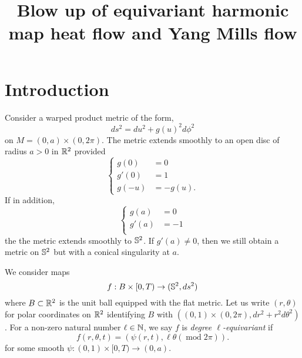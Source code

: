\documentclass{amsart}
\begin{document}
\title[]
 {Blow up of equivariant harmonic map heat flow and Yang Mills flow}

\curraddr{}
\email{}

\dedicatory{}
\subjclass[2010]{}
\keywords{}

\begin{abstract}
\end{abstract}

\maketitle

\section{Introduction}
\label{sec:intro}

Consider a warped product metric of the form,
\[
ds^2 = du^2 + g(u)^2 d\phi^2
\]
on $M = (0, a) \times (0, 2\pi)$. The metric extends smoothly to an open disc of radius $a > 0$ in $\R^2$ provided
\[
\begin{cases}
g(0) &= 0 \\
g'(0) &= 1 \\
g(-u) &= - g(u).
\end{cases}
\]
If in addition,
\[
\begin{cases}
g(a) &= 0 \\
g'(a) &= -1 \\
\end{cases}
\]
the the metric extends smoothly to $\S^2$. If $g'(a) \ne 0$, then we still obtain a metric on $\S^2$ but with a conical singularity at $a$.

We consider maps
\[
f : B \times [0, T) \to (\S^2, ds^2)
\]
where $B \subset \R^2$ is the unit ball equipped with the flat metric. Let us write $(r, \theta)$ for polar coordinates on $\R^2$ identifying $B$ with $((0, 1) \times (0, 2\pi), dr^2 + r^2 d\theta^2)$. For a non-zero natural number \(\ell \in \N\), we say $f$ is \emph{degree $\ell$-equivariant} if
\[
f (r, \theta, t) = (\psi(r, t), \ell\theta (\operatorname{mod} 2\pi)).
\]
for some smooth $\psi : (0, 1) \times [0, T) \to (0, a)$.
\end{document}
